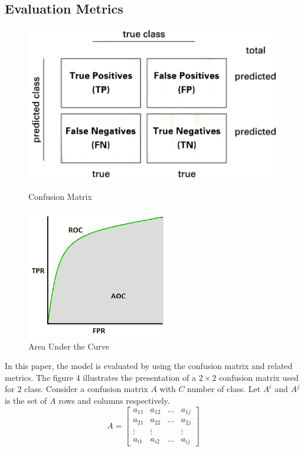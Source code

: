\documentclass[sensors,article,submit,pdftex,moreauthors]{Definitions/mdpi}
\begin{document}
\subsection{Evaluation Metrics}
\begin{figure}[!htb]
	\begin{minipage}{0.48\textwidth}
		\centering
		\includegraphics[width=1.1\linewidth]{Definitions/Confusion-matrix}
		\caption{Confusion Matrix}\label{Fig:Data1}
	\end{minipage}\hfill
	\begin{minipage}{0.48\textwidth}
		\centering
		\includegraphics[width=.7\linewidth]{Definitions/AUC}
		\caption{Area Under the Curve}\label{Fig:Data2}
	\end{minipage}
\end{figure}
In this paper, the model is evaluated by using the confusion matrix and related metrics. The figure 4 illustrates the presentation of a $2 \times 2$ confusion matrix used for $2$ class. Consider a confusion matrix $A$ with $C$ number of class. Let $A^i$ and $A^j$ is the set of $A$ rows and columns respectively. 
\[
A = \begin{bmatrix}
	a_{11} & a_{12} & \dots & a_{1j} \\
	a_{21} & a_{22} & \dots & a_{2j} \\
	\vdots & \vdots	&  & \vdots\\
	a_{i1} & a_{i2} & \dots & a_{ij} 
\end{bmatrix}
\]
\end{document}

